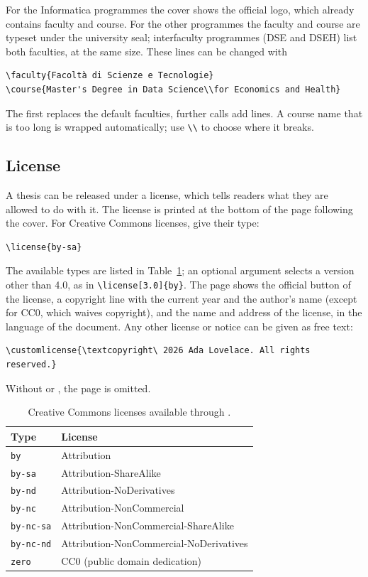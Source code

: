 For the Informatica programmes the cover shows the official logo, which
already contains faculty and course. For the other programmes the faculty
and course are typeset under the university seal; interfaculty programmes
(DSE and DSEH) list both faculties, at the same size. These lines can be
changed with
\begin{Verbatim}
\faculty{Facoltà di Scienze e Tecnologie}
\course{Master's Degree in Data Science\\for Economics and Health}
\end{Verbatim}
The first  replaces the default faculties, further calls add
lines. A course name that is too long is wrapped automatically; use
\verb|\\| to choose where it breaks.

\subsection{License} \label{sec:license}

A thesis can be released under a license, which tells readers what they are
allowed to do with it. The license is printed at the bottom of the page
following the cover. For Creative Commons licenses, give their type:
\begin{Verbatim}
\license{by-sa}
\end{Verbatim}
The available types are listed in Table~\ref{tab:licenses}; an optional
argument selects a version other than 4.0, as in \verb|\license[3.0]{by}|.
The page shows the official button of the license, a copyright line with
the current year and the author's name (except for CC0, which waives
copyright), and the name and address of the license, in the language of
the document. Any other license or notice can be given as free text:
\begin{Verbatim}
\customlicense{\textcopyright\ 2026 Ada Lovelace. All rights reserved.}
\end{Verbatim}
Without  or , the page is omitted.

\begin{table}[htbp]
  \centering
  \caption{Creative Commons licenses available through .}
  \label{tab:licenses}
  \begin{tabular}{ll}
    \toprule
    Type & License \\
    \midrule
    \texttt{by}       & Attribution \\
    \texttt{by-sa}    & Attribution-ShareAlike \\
    \texttt{by-nd}    & Attribution-NoDerivatives \\
    \texttt{by-nc}    & Attribution-NonCommercial \\
    \texttt{by-nc-sa} & Attribution-NonCommercial-ShareAlike \\
    \texttt{by-nc-nd} & Attribution-NonCommercial-NoDerivatives \\
    \texttt{zero}     & CC0 (public domain dedication) \\
    \bottomrule
  \end{tabular}
\end{table}

